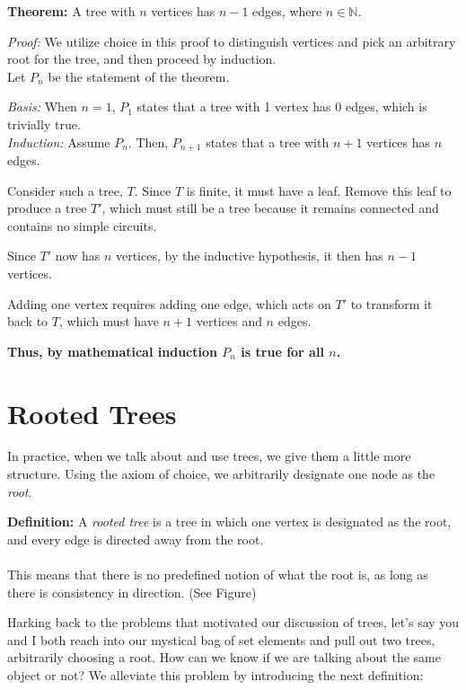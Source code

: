 \documentclass[a4paper,10pt]{report}
\begin{document}
\textbf{Theorem:} A tree with $n$ vertices has $n-1$ edges, where $n\in\mathbb{N}$.

\textit{Proof: }We utilize choice in this proof to distinguish vertices and pick an arbitrary root for the tree, and then proceed by induction. \\

Let $P_n$ be the statement of the theorem.

\textit{Basis: }
When $n=1$, $P_1$ states that a tree with 1 vertex has 0 edges, which is trivially true. \\

\textit{Induction: }
Assume $P_n$. Then, $P_{n+1}$ states that a tree with $n+1$ vertices has $n$ edges.

Consider such a tree, $T$. Since $T$ is finite, it must have a leaf. Remove this leaf to produce a tree $T'$, which must still be a tree because it remains connected and contains no simple circuits.

Since $T'$ now has $n$ vertices, by the inductive hypothesis, it then has $n-1$ vertices.

Adding one vertex requires adding one edge, which acts on $T'$ to transform it back to $T$, which must have $n+1$ vertices and $n$ edges.

\textbf{Thus, by mathematical induction $P_n$ is true for all $n$.}

\hrulefill

\chapter{Rooted Trees}
In practice, when we talk about and use trees, we give them a little more structure. Using the axiom of choice, we arbitrarily designate one node as the \textit{root}.

\textbf{Definition:} A \textit{rooted tree} is a tree in which one vertex is designated as the root, and every edge is directed away from the root.\\ \\

This means that there is no predefined notion of what the root is, as long as there is consistency in direction. (See Figure)


Harking back to the problems that motivated our discussion of trees, let's say you and I both reach into our mystical bag of set elements and pull out two trees, arbitrarily choosing a root. How can we know if we are talking about the same object or not? We alleviate this problem by introducing the next definition:\\
\end{document}
